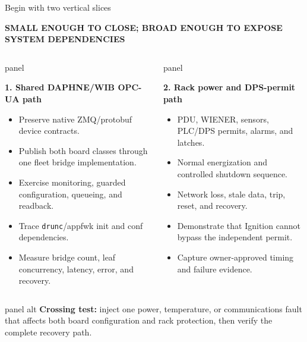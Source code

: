 \documentclass[aspectratio=169,10pt]{beamer}
\newcommand{\eyebrow}[1]{{\color{noircyan}\scriptsize\bfseries #1\par}}
\newcommand{\tightitem}{%
  \setlength{\itemsep}{0.8mm}%
  \setlength{\parskip}{0pt}%
}
\newcommand{\fixedpanel}[4][panel]{%
  \begin{beamercolorbox}[wd=\linewidth,sep=4pt,rounded=true]{#1}
    \begin{minipage}[t][#2][t]{\dimexpr\linewidth-8pt\relax}
      \raggedright
      {\usebeamercolor[fg]{#1}\bfseries #3\par}
      \vspace{0.45mm}
      {\usebeamercolor[fg]{#1}\footnotesize #4\par}
    \end{minipage}
  \end{beamercolorbox}
}
\begin{document}
\begin{frame}[t]{Begin with two vertical slices}
\eyebrow{SMALL ENOUGH TO CLOSE; BROAD ENOUGH TO EXPOSE SYSTEM DEPENDENCIES}
\vspace{1.0mm}

\begin{columns}[T,onlytextwidth]
\fixedpanel{3.65cm}{1. Shared DAPHNE/WIB OPC-UA path}{
\begin{itemize}\tightitem
  \item Preserve native ZMQ/protobuf device contracts.
  \item Publish both board classes through one fleet bridge implementation.
  \item Exercise monitoring, guarded configuration, queueing, and readback.
  \item Trace \texttt{drunc}/appfwk init and conf dependencies.
  \item Measure bridge count, leaf concurrency, latency, error, and recovery.
\end{itemize}
}

\fixedpanel{3.65cm}{2. Rack power and DPS-permit path}{
\begin{itemize}\tightitem
  \item PDU, WIENER, sensors, PLC/DPS permits, alarms, and latches.
  \item Normal energization and controlled shutdown sequence.
  \item Network loss, stale data, trip, reset, and recovery.
  \item Demonstrate that Ignition cannot bypass the independent permit.
  \item Capture owner-approved timing and failure evidence.
\end{itemize}
}
\end{columns}

\vspace{1mm}
\begin{beamercolorbox}[wd=\linewidth,sep=6pt,rounded=true]{panel alt}
\centering
\textcolor{purpletest}{\bfseries Crossing test:}\quad
inject one power, temperature, or communications fault that affects both
board configuration and rack protection, then verify the complete recovery path.
\end{beamercolorbox}
\end{frame}
\end{document}
